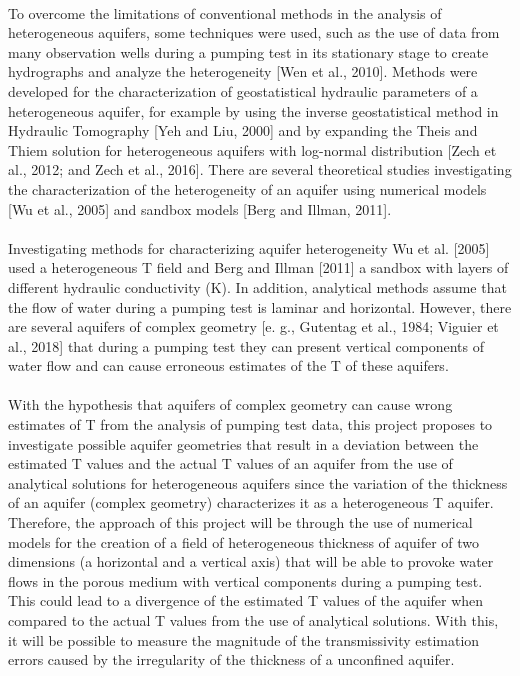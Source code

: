 \documentclass[11pt, a4paper]{article}
\begin{document}
    \paragraph{}
    To overcome the limitations of conventional methods in the analysis of heterogeneous aquifers, some techniques were used, such as the use of data from many observation wells during a pumping test in its stationary stage to create hydrographs and analyze the heterogeneity [Wen et al., 2010]. Methods were developed for the characterization of geostatistical hydraulic parameters of a heterogeneous aquifer, for example by using the inverse geostatistical method in Hydraulic Tomography [Yeh and Liu, 2000] and by expanding the Theis and Thiem solution for heterogeneous aquifers with log-normal distribution [Zech et al., 2012; and Zech et al., 2016]. There are several theoretical studies investigating the characterization of the heterogeneity of an aquifer using numerical models [Wu et al., 2005] and sandbox models [Berg and Illman, 2011].
    \paragraph{}
    Investigating methods for characterizing aquifer heterogeneity Wu et al. [2005] used a heterogeneous T field and Berg and Illman [2011] a sandbox with layers of different hydraulic conductivity (K). In addition, analytical methods assume that the flow of water during a pumping test is laminar and horizontal. However, there are several aquifers of complex geometry [e. g., Gutentag et al., 1984; Viguier et al., 2018] that during a pumping test they can present vertical components of water flow and can cause erroneous estimates of the T of these aquifers.
    \paragraph{} %
    With the hypothesis that aquifers of complex geometry can cause wrong estimates of T from the analysis of pumping test data, this project proposes to investigate possible aquifer geometries that result in a deviation between the estimated T values and the actual T values of an aquifer from the use of analytical solutions for heterogeneous aquifers since the variation of the thickness of an aquifer (complex geometry) characterizes it as a heterogeneous T aquifer. Therefore, the approach of this project will be through the use of numerical models for the creation of a field of heterogeneous thickness of aquifer of two dimensions (a horizontal and a vertical axis) that will be able to provoke water flows in the porous medium with vertical components during a pumping test. This could lead to a divergence of the estimated T values of the aquifer when compared to the actual T values from the use of analytical solutions. With this, it will be possible to measure the magnitude of the transmissivity estimation errors caused by the irregularity of the thickness of a unconfined aquifer.
\end{document}
